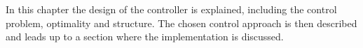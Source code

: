 \vspace{-6mm}
In this chapter the design of the controller is explained, including the control problem, optimality and structure. The chosen control approach is then described and leads up to a section where the implementation is discussed. 
\vspace{-4mm}
%
%
%
